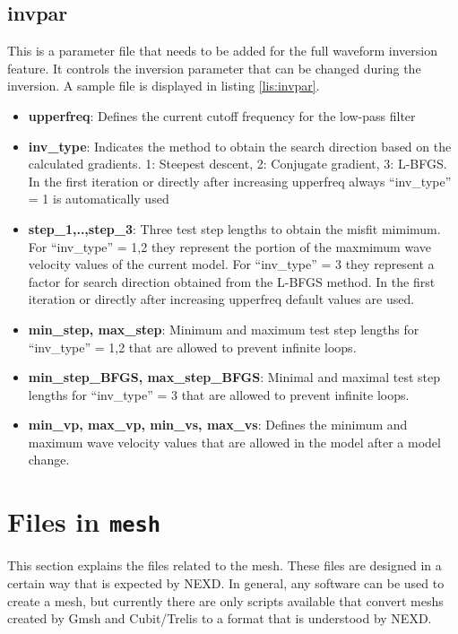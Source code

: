    	\subsection{invpar}
    \label{subsec:invpar}
    	This is a parameter file that needs to be added for the full waveform inversion feature. It controls the inversion parameter that can be changed during the inversion. A sample file is displayed in listing \ref{lis:invpar}.
    	 
    	\begin{itemize}
    		\item \textbf{upperfreq}: Defines the current cutoff frequency for the low-pass filter
    		\item \textbf{inv\_type}: Indicates the method to obtain the search direction based on the calculated gradients. 1: Steepest descent, 2: Conjugate gradient, 3: L-BFGS. In the first iteration or directly after increasing upperfreq always ``inv\_type'' = 1 is automatically used
    		\item \textbf{step\_1,..,step\_3}: Three test step lengths to obtain the misfit mimimum. For ``inv\_type'' = 1,2 they represent the portion of the maxmimum wave velocity values of the current model. For ``inv\_type'' = 3 they represent a factor for search direction obtained from the L-BFGS method. In the first iteration or directly after increasing upperfreq default values are used.
    		\item \textbf{min\_step, max\_step}: Minimum and maximum test step lengths for ``inv\_type'' = 1,2 that are allowed to prevent infinite loops.
    		\item \textbf{min\_step\_BFGS, max\_step\_BFGS}: Minimal and maximal test step lengths for ``inv\_type'' = 3 that are allowed to prevent infinite loops.
    		\item \textbf{min\_vp, max\_vp, min\_vs, max\_vs}: Defines the minimum and maximum wave velocity values that are allowed in the model after a model change.
    	\end{itemize}
    \section{Files in \texttt{mesh}}
    \label{sec:cubfiles}
    	This section explains the files related to the mesh. These files are designed in a certain way that is expected by NEXD. 
    	In general, any software can be used to create a mesh, but currently there are only scripts available that convert meshs created by Gmsh and Cubit/Trelis to a format that is understood by NEXD.
